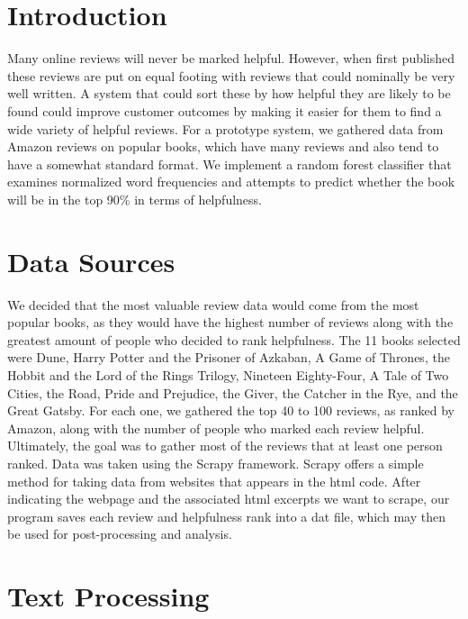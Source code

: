\documentclass{article}
\begin{document}
\begin{multicols}{2}
\section{Introduction}
	Many online reviews will never be marked helpful. However, when first published these reviews are put on equal footing with reviews that could nominally be very well written. A system that could sort these by how helpful they are likely to be found could improve customer outcomes by making it easier for them to find a wide variety of helpful reviews. For a prototype system, we gathered data from Amazon reviews on popular books, which have many reviews and also tend to have a somewhat standard format. We implement a random forest classifier that examines normalized word frequencies and attempts to predict whether the book will be in the top 90\% in terms of helpfulness. 

\section{Data Sources}

We decided that the most valuable review data would come from the most popular books, as they would have the highest number of reviews along with the greatest amount of people who decided to rank helpfulness. The 11 books selected were Dune, Harry Potter and the Prisoner of Azkaban, A Game of Thrones, the Hobbit and the Lord of the Rings Trilogy, Nineteen Eighty-Four, A Tale of Two Cities, the Road, Pride and Prejudice, the Giver, the Catcher in the Rye, and the Great Gatsby. For each one, we gathered the top 40 to 100 reviews, as ranked by Amazon, along with the number of people who marked each review helpful. Ultimately, the goal was to gather most of the reviews that at least one person ranked. Data was taken using the Scrapy framework. Scrapy offers a simple method for taking data from websites that appears in the html code. After indicating the webpage and the associated html excerpts we want to scrape, our program saves each review and helpfulness rank into a dat file, which may then be used for post-processing and analysis.


\section{Text Processing}


\end{multicols}
\end{document}

